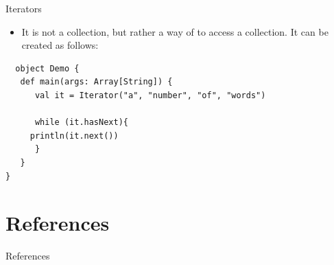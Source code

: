 \documentclass[presentation, aspectratio=169]{beamer}
\begin{document}
\begin{frame}{Iterators}
 \begin{itemize}
\item It is not a collection, but rather a way of to access a collection. 
It can be created as follows:
\end{itemize}
\tiny
\begin{verbatim}
  object Demo {
   def main(args: Array[String]) {
      val it = Iterator("a", "number", "of", "words")

      while (it.hasNext){
	 println(it.next())
      }
   }
}
\end{verbatim}
\end{frame}


\section{References}
\label{sec:org70df0de}
\begin{frame}[allowframebreaks,label=]{References}
\printbibliography
\end{frame}
\end{document}

